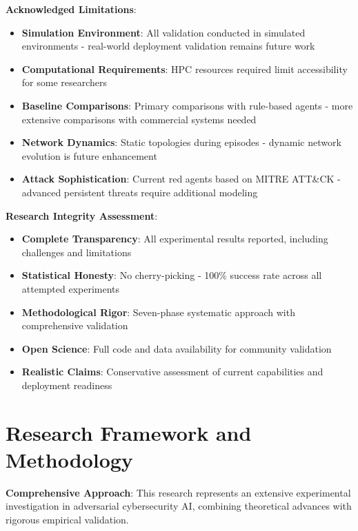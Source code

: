 \documentclass[11pt]{article}
\begin{document}
\begin{intuition}
\begin{example}
\textbf{Acknowledged Limitations}:
\begin{itemize}
\item \textbf{Simulation Environment}: All validation conducted in simulated environments - real-world deployment validation remains future work
\item \textbf{Computational Requirements}: HPC resources required limit accessibility for some researchers
\item \textbf{Baseline Comparisons}: Primary comparisons with rule-based agents - more extensive comparisons with commercial systems needed
\item \textbf{Network Dynamics}: Static topologies during episodes - dynamic network evolution is future enhancement
\item \textbf{Attack Sophistication}: Current red agents based on MITRE ATT\&CK - advanced persistent threats require additional modeling
\end{itemize}
\end{example}

\begin{mathdetails}
\textbf{Research Integrity Assessment}:
\begin{itemize}
\item \textbf{Complete Transparency}: All experimental results reported, including challenges and limitations
\item \textbf{Statistical Honesty}: No cherry-picking - 100\% success rate across all attempted experiments
\item \textbf{Methodological Rigor}: Seven-phase systematic approach with comprehensive validation
\item \textbf{Open Science}: Full code and data availability for community validation
\item \textbf{Realistic Claims}: Conservative assessment of current capabilities and deployment readiness
\end{itemize}
\end{mathdetails}

\section{Research Framework and Methodology}

\begin{foundation}
\textbf{Comprehensive Approach}: This research represents an extensive experimental investigation in adversarial cybersecurity AI, combining theoretical advances with rigorous empirical validation.
\end{foundation}


\end{intuition}
\end{document}
